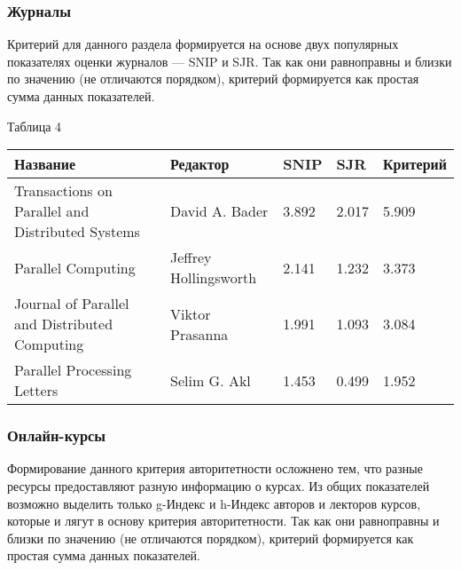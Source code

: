 \documentclass{article}
\begin{document}
		\subsubsection{Журналы}
		Критерий для данного раздела формируется на основе двух популярных показателях оценки журналов — SNIP и SJR. Так как они равноправны и близки по значению (не отличаются порядком), критерий формируется как простая сумма данных показателей.
		\begin{flushleft}
				Таблица 4
				\begin{longtable}{|p{7cm}|p{3cm}|p{1.5cm}|p{1.5cm}|p{2.3cm}|} \hline
				
Название & Редактор & SNIP & SJR & Критерий \\\hline

Transactions on Parallel and Distributed Systems &
David A. Bader  & 3.892 & 2.017 & 5.909\\\hline

Parallel Computing &
Jeffrey Hollingsworth &2.141 & 1.232 & 3.373\\\hline

Journal of Parallel and Distributed Computing &
Viktor Prasanna & 1.991 & 1.093 & 3.084\\\hline

Parallel Processing Letters &
Selim G. Akl & 1.453 & 0.499 & 1.952\\\hline
				\end{longtable}
			\end{flushleft}	
\newpage
		\subsubsection{Онлайн-курсы}
		Формирование данного критерия авторитетности осложнено тем, что разные ресурсы предоставляют разную информацию о курсах. Из общих показателей возможно выделить только g-Индекс и h-Индекс авторов и лекторов курсов, которые и лягут в основу критерия авторитетности. Так как они равноправны и близки по значению (не отличаются порядком), критерий формируется как простая сумма данных показателей.
\end{document}
